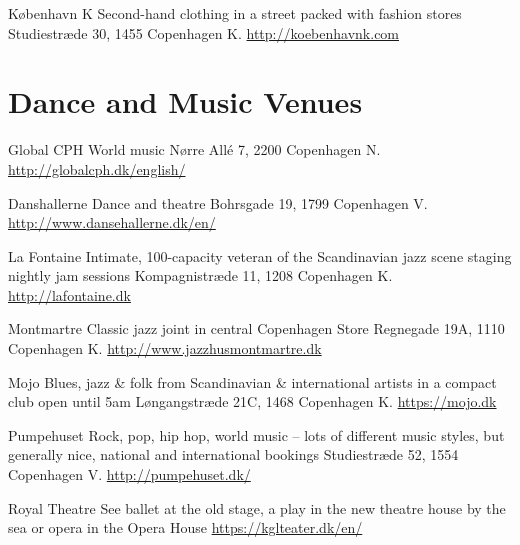 \begin{left}
\begin{shopitem}
{København K}%
{Second-hand clothing in a street packed with fashion stores}%
{Studiestræde 30, 1455 Copenhagen K.}%
{\url{http://koebenhavnk.com}}%
\end{shopitem}

\section*{Dance and Music Venues}
\begin{shopitem}
{Global CPH}%
{World music}%
{Nørre Allé 7, 2200 Copenhagen N.}%
{\url{http://globalcph.dk/english/}}%
\end{shopitem}

\begin{shopitem}
{Danshallerne}%
{Dance and theatre}%
{Bohrsgade 19, 1799 Copenhagen V.}%
{\url{http://www.dansehallerne.dk/en/}}%
\end{shopitem}

\begin{shopitem}
{La Fontaine}%
{Intimate, 100-capacity veteran of the Scandinavian jazz scene staging nightly jam sessions}%
{Kompagnistræde 11, 1208 Copenhagen K.}%
{\url{http://lafontaine.dk}}%
\end{shopitem}

\begin{shopitem}
{Montmartre}%
{Classic jazz joint in central Copenhagen}%
{Store Regnegade 19A, 1110 Copenhagen K.}%
{\url{http://www.jazzhusmontmartre.dk}}%
\end{shopitem}

\begin{shopitem}
{Mojo}%
{Blues, jazz \& folk from Scandinavian \& international artists in a compact club open until 5am}%
{Løngangstræde 21C, 1468 Copenhagen K.}%
{\url{https://mojo.dk}}%
\end{shopitem}

\begin{shopitem}
{Pumpehuset}%
{Rock, pop, hip hop, world music -- lots of different music styles, but generally nice, national and international bookings}%
{Studiestræde 52, 1554 Copenhagen V.}%
{\url{http://pumpehuset.dk/}}%
\end{shopitem}

\begin{shopitem}
{Royal Theatre}%
{See ballet at the old stage, a play in the new theatre house by the sea or opera in the Opera House}%
{}%
{\url{https://kglteater.dk/en/}}%
\end{shopitem}


\end{left}
